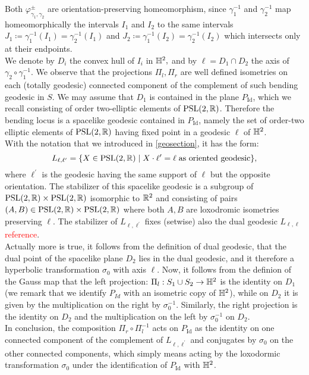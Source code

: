     Both $\varphi_{\gamma_1,\gamma_2}^{\pm}$ are orientation-preserving homeomorphism, since $\gamma_1^{-1}$ and $\gamma_2^{-1}$ map homeomorphically the intervals $I_1$ and $I_2$ to the same intervals $J_1\coloneqq\gamma_1^{-1}(I_1)=\gamma_2^{-1}(I_1)$ and $J_2\coloneqq\gamma_1^{-1}(I_2)=\gamma_2^{-1}(I_2)$ which intersects only at their endpoints. \\
    We denote by $D_i$ the convex hull of $I_i$ in $\mathbb{H}^2,$ and by $\ell=D_1\cap D_2$ the axis of $\gamma_2\circ\gamma_1^{-1}$. 
    We observe that the projections $\Pi_l, \Pi_r$ are well defined isometries on each (totally geodesic) connected component of the complement of such bending geodesic in $S$. We may assume that $D_1$ is contained in the plane $P_{\text{Id}}$, which we recall consisting of order two-elliptic elements of $\text{PSL}(2,\mathbb{R})$. Therefore the bending locus is a spacelike geodesic contained in $P_{\text{Id}}$, namely the set of order-two elliptic elements of $\text{PSL}(2,\mathbb{R})$ having fixed point in a geodesic $\ell$ of $\mathbb{H}^2$. \\ 
    With the notation that we introduced in \ref{geosection}, it has the form: 
    \[
        L_{\ell,\ell^{\prime}}=\{X\in\text{PSL}(2,\mathbb{R})\;|\;X\cdot\ell^{\prime} =\ell\; \text{as oriented geodesic}\}, 
    \]
    where $\ell^{\prime}$ is the geodesic having the same support of $\ell$ but the opposite orientation. The stabilizer of this spacelike geodesic is a subgroup of $\text{PSL}(2,\mathbb{R})\times\text{PSL}(2,\mathbb{R})$ isomorphic to $\mathbb{R}^2$ and consisting of pairs $(A,B)\in\text{PSL}(2,\mathbb{R})\times\text{PSL}(2,\mathbb{R})$ where both $A,B$ are loxodromic isometries preserving $\ell$. The stabilizer of $L_{\ell,\ell^{\prime}}$ fixes (setwise) also the dual geodesic $L_{\ell,\ell}$ \textcolor{red}{reference}. \\
    Actually more is true, it follows from the definition of dual geodesic, that the dual point of the spacelike plane $D_2$ lies in the dual geodesic, and it therefore a hyperbolic transformation $\sigma_0$ with axis $\ell$. Now, it follows from the definion of the Gauss map that the left projection: \(\Pi_l:S_1\cup S_2\to\mathbb{H}^2\) is the identity on $D_1$ (we remark that we identify $P_{Id}$ with an isometric copy of $\mathbb{H}^2$), while on $D_2$ it is given by the multiplication on the right by $\sigma_0^{-1}$. Similarly, the right projection is the identity on $D_2$ and the multiplication on the left by $\sigma_0^{-1}$ on $D_2$.\\
    In conclusion, the composition $\Pi_r\circ\Pi_l^{-1}$ acts on $P_{\text{Id}}$ as the identity on one connected component of the complement of $L_{\ell,\ell^{\prime}}$ and conjugates by $\sigma_0$ on the other connected components, which simply means acting by the loxodormic transformation $\sigma_0$ under the identification of $P_{\text{Id}}$ with $\mathbb{H}^2$.\\
